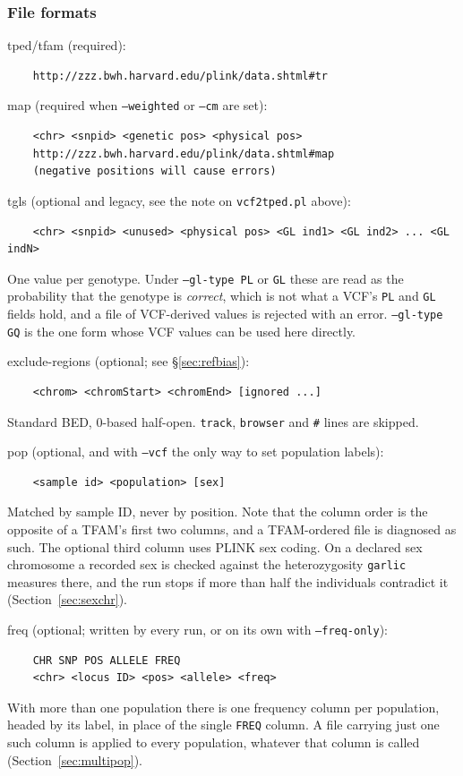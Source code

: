 \documentclass[12pt]{article}%
\begin{document}
\subsubsection{File formats}
\noindent tped/tfam (required):\\
\begin{verbatim}
	http://zzz.bwh.harvard.edu/plink/data.shtml#tr
\end{verbatim}
\noindent map (required when {\tt --weighted} or {\tt --cm} are set):
\begin{verbatim}
	<chr> <snpid> <genetic pos> <physical pos>
	http://zzz.bwh.harvard.edu/plink/data.shtml#map 
	(negative positions will cause errors)
\end{verbatim}
\noindent tgls (optional and legacy, see the note on {\tt vcf2tped.pl} above):
\begin{verbatim}
	<chr> <snpid> <unused> <physical pos> <GL ind1> <GL ind2> ... <GL indN>
\end{verbatim}
\noindent One value per genotype.  Under {\tt --gl-type PL} or {\tt GL} these are read as the probability that the genotype is {\em correct}, which is not what a VCF's {\tt PL} and {\tt GL} fields hold, and a file of VCF-derived values is rejected with an error.  {\tt --gl-type GQ} is the one form whose VCF values can be used here directly.

\noindent exclude-regions (optional; see \S\ref{sec:refbias}):
\begin{verbatim}
	<chrom> <chromStart> <chromEnd> [ignored ...]
\end{verbatim}
\noindent Standard BED, 0-based half-open.  {\tt track}, {\tt browser} and {\tt \#} lines are skipped.

\noindent pop (optional, and with {\tt --vcf} the only way to set population labels):
\begin{verbatim}
	<sample id> <population> [sex]
\end{verbatim}
\noindent Matched by sample ID, never by position.  Note that the column order is the opposite of a TFAM's first two columns, and a TFAM-ordered file is diagnosed as such.  The optional third column uses PLINK sex coding.  On a declared sex chromosome a recorded sex is checked against the heterozygosity {\tt garlic} measures there, and the run stops if more than half the individuals contradict it (Section~\ref{sec:sexchr}).

\noindent freq (optional; written by every run, or on its own with {\tt --freq-only}):
\begin{verbatim}
	CHR SNP POS ALLELE FREQ
	<chr> <locus ID> <pos> <allele> <freq>
\end{verbatim}
\noindent With more than one population there is one frequency column per
population, headed by its label, in place of the single {\tt FREQ} column.  A
file carrying just one such column is applied to every population, whatever
that column is called (Section~\ref{sec:multipop}).
\end{document}
